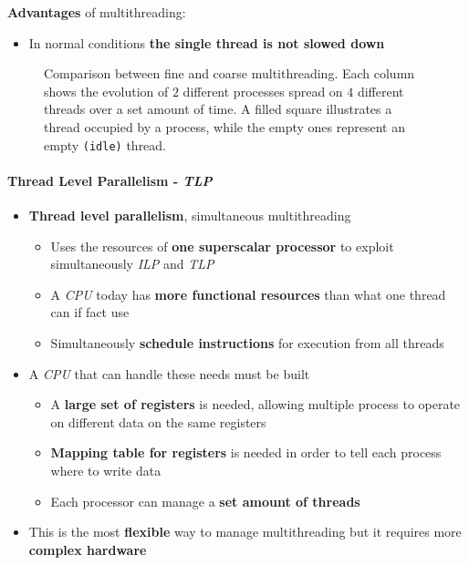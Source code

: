 \documentclass[english]{article}
\begin{document}
\textbf{Advantages} of multithreading:
\begin{itemize}[label=\cmark]
  \item In normal conditions \textbf{the single thread is not slowed down}
\end{itemize}

\begin{figure}[htbp]
  \bigskip
  \centering
  \caption{\centering Comparison between fine and coarse multithreading. Each column shows the evolution of \(2\) different processes spread on \(4\) different threads over a set amount of time.
    A filled square illustrates a thread occupied by a process, while the empty ones represent an empty \texttt{(idle)} thread.}
  \label{fig:multithreading-fine-coarse-comparison}
  \bigskip
\end{figure}

\paragraph{Thread Level Parallelism - \textit{TLP}}

\begin{itemize}
  \item \textbf{Thread level parallelism}, simultaneous multithreading
        \begin{itemize}
          \item Uses the resources of \textbf{one superscalar processor} to exploit simultaneously \textit{ILP} and \textit{TLP}
          \item A \textit{CPU} today has \textbf{more functional resources} than what one thread can if fact use
          \item Simultaneously \textbf{schedule instructions} for execution from all threads
        \end{itemize}
  \item A \textit{CPU} that can handle these needs must be built
        \begin{itemize}
          \item A \textbf{large set of registers} is needed, allowing multiple process to operate on different data on the same registers
          \item \textbf{Mapping table for registers} is needed in order to tell each process where to write data
          \item Each processor can manage a \textbf{set amount of threads}
        \end{itemize}
  \item This is the most \textbf{flexible} way to manage multithreading but it requires more \textbf{complex hardware}
\end{itemize}
\bigskip
\end{document}
